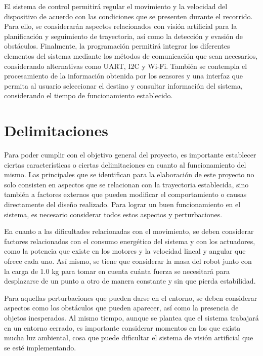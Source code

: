El sistema de control permitirá regular el movimiento y la velocidad del dispositivo de acuerdo con las condiciones que se presenten durante el recorrido. Para ello, se considerarán aspectos relacionados con visión artificial para la planificación y seguimiento de trayectoria, así como la detección y evasión de obstáculos. Finalmente, la programación permitirá integrar los diferentes elementos del sistema mediante los métodos de comunicación que sean necesarios, considerando alternativas como UART, I2C y Wi-Fi. También se contempla el procesamiento de la información obtenida por los sensores y una interfaz que permita al usuario seleccionar el destino y consultar información del sistema, considerando el tiempo de funcionamiento establecido.

\section{Delimitaciones}
\label{sec:proto-delimitaciones}

Para poder cumplir con el objetivo general del proyecto, es importante establecer ciertas características o ciertas delimitaciones en cuanto al funcionamiento del mismo. Las principales que se identifican para la elaboración de este proyecto no solo consisten en aspectos que se relacionan con la trayectoria establecida, sino también a factores externos que pueden modificar el comportamiento o causas directamente del diseño realizado. Para lograr un buen funcionamiento en el sistema, es necesario considerar todos estos aspectos y perturbaciones.

En cuanto a las dificultades relacionadas con el movimiento, se deben considerar factores relacionados con el consumo energético del sistema y con los actuadores, como la potencia que existe en los motores y la velocidad lineal y angular que ofrece cada uno. Así mismo, se tiene que considerar la masa del robot junto con la carga de 1.0 kg para tomar en cuenta cuánta fuerza se necesitará para desplazarse de un punto a otro de manera constante y sin que pierda estabilidad.

Para aquellas perturbaciones que pueden darse en el entorno, se deben considerar aspectos como los obstáculos que pueden aparecer, así como la presencia de objetos inesperados. Al mismo tiempo, aunque se plantea que el sistema trabajará en un entorno cerrado, es importante considerar momentos en los que exista mucha luz ambiental, cosa que puede dificultar el sistema de visión artificial que se esté implementando.

